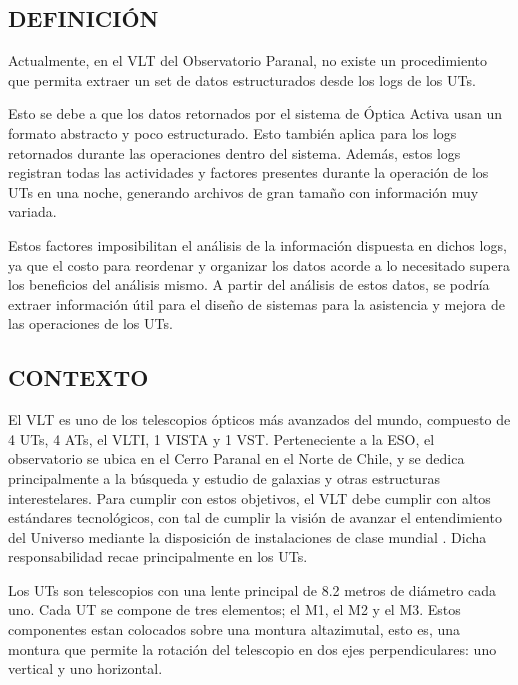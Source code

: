 
\subsection{DEFINICIÓN}

Actualmente, en el VLT del Observatorio Paranal, no existe un procedimiento que permita extraer un set de datos estructurados desde los logs de los UTs. 

Esto se debe a que los datos retornados por el sistema de Óptica Activa usan un formato abstracto y poco estructurado. Esto también aplica para los logs retornados durante las operaciones dentro del sistema. Además, estos logs registran todas las actividades y factores presentes durante la operación de los UTs en una noche, generando archivos de gran tamaño con información muy variada.

Estos factores imposibilitan el análisis de la información dispuesta en dichos logs, ya que el costo para reordenar y organizar los datos acorde a lo necesitado supera los beneficios del análisis mismo. A partir del análisis de estos datos, se podría extraer información útil para el diseño de sistemas para la asistencia y mejora de las operaciones de los UTs.

\subsection{CONTEXTO}

El VLT es uno de los telescopios ópticos más avanzados del mundo, compuesto de 4 UTs, 4 ATs, el VLTI, 1 VISTA y 1 VST\cite{eso2023paranal}.
Perteneciente a la ESO, el observatorio se ubica en el Cerro Paranal en el Norte de Chile, y se dedica principalmente a la búsqueda y estudio de galaxias y otras estructuras interestelares\cite{eso1998vlt}.
Para cumplir con estos objetivos, el VLT debe cumplir con altos estándares tecnológicos, con tal de cumplir la visión de avanzar el entendimiento del Universo mediante la disposición de instalaciones de clase mundial \cite{eso1998vlt}. Dicha responsabilidad recae principalmente en los UTs.

Los UTs son telescopios con una lente principal de 8.2 metros de diámetro cada uno. Cada UT se compone de tres elementos; el M1, el M2 y el M3. Estos componentes estan colocados sobre una montura altazimutal, esto es, una montura que permite la rotación del telescopio en dos ejes perpendiculares: uno vertical y uno horizontal.\cite{eso2011m2}

